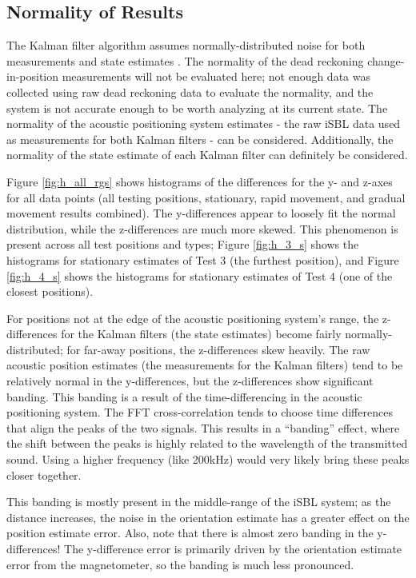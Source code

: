 \documentclass[12pt,a4paper]{report}
\begin{document}
\subsection{Normality of Results} \label{ssec:6s2s5}
The Kalman filter algorithm assumes normally-distributed noise for both measurements and state estimates \cite{kalman}. The normality of the dead reckoning change-in-position measurements will not be evaluated here; not enough data was collected using raw dead reckoning data to evaluate the normality, and the system is not accurate enough to be worth analyzing at its current state. The normality of the acoustic positioning system estimates - the raw iSBL data used as measurements for both Kalman filters - can be considered. Additionally, the normality of the state estimate of each Kalman filter can definitely be considered.

Figure \ref{fig:h_all_rgs} shows histograms of the differences for the y- and z-axes for all data points (all testing positions, stationary, rapid movement, and gradual movement results combined). The y-differences appear to loosely fit the normal distribution, while the z-differences are much more skewed. This phenomenon is present across all test positions and types; Figure \ref{fig:h_3_s} shows the histograms for stationary estimates of Test 3 (the furthest position), and Figure \ref{fig:h_4_s} shows the histograms for stationary estimates of Test 4 (one of the closest positions). 

For positions not at the edge of the acoustic positioning system’s range, the z-differences for the Kalman filters (the state estimates) become fairly normally-distributed; for far-away positions, the z-differences skew heavily. The raw acoustic position estimates (the measurements for the Kalman filters) tend to be relatively normal in the y-differences, but the z-differences show significant banding. This banding is a result of the time-differencing in the acoustic positioning system. The FFT cross-correlation tends to choose time differences that align the peaks of the two signals. This results in a “banding” effect, where the shift between the peaks is highly related to the wavelength of the transmitted sound. Using a higher frequency (like 200kHz) would very likely bring these peaks closer together.

This banding is mostly present in the middle-range of the iSBL system; as the distance increases, the noise in the orientation estimate has a greater effect on the position estimate error. Also, note that there is almost zero banding in the y-differences! The y-difference error is primarily driven by the orientation estimate error from the magnetometer, so the banding is much less pronounced. 
\end{document}
